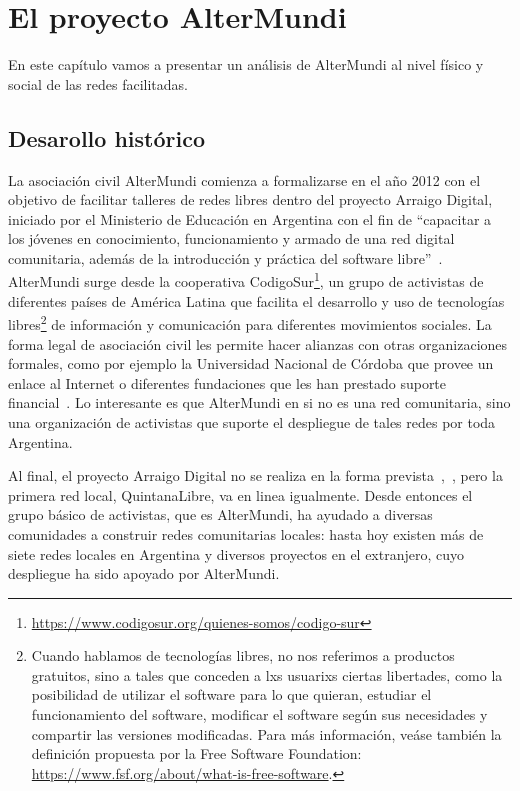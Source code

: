 \section{El proyecto AlterMundi}

En este capítulo vamos a presentar un análisis de AlterMundi al nivel físico y social de las redes facilitadas.

\subsection{Desarollo histórico}

La asociación civil AlterMundi comienza a formalizarse en el año 2012 con el objetivo de facilitar talleres de redes libres dentro del proyecto Arraigo Digital, iniciado por el Ministerio de Educación en Argentina con el fin de ``capacitar a los jóvenes en conocimiento, funcionamiento y armado de una red digital comunitaria, además de la introducción y práctica del software libre''~\autocite{Piccoli2015}.
AlterMundi surge desde la cooperativa CodigoSur\footnote{\url{https://www.codigosur.org/quienes-somos/codigo-sur}}, un grupo de activistas de diferentes países de América Latina que facilita el desarrollo y uso de tecnologías libres\footnote{Cuando
 hablamos de tecnologías libres, no nos referimos a productos gratuitos, sino a tales que conceden a lxs usuarixs ciertas libertades, como la posibilidad de utilizar el software para lo que quieran, estudiar el funcionamiento del software, modificar el software según sus necesidades y compartir las versiones modificadas.
Para más información, veáse también la definición propuesta por la Free Software Foundation: \url{https://www.fsf.org/about/what-is-free-software}.}
de información y comunicación para diferentes movimientos sociales.
La forma legal de asociación civil les permite hacer alianzas con otras organizaciones formales, como por ejemplo la Universidad Nacional de Córdoba que provee un enlace al Internet o diferentes fundaciones que les han prestado suporte financial~\autocite{Vaseva2016a}.
Lo interesante es que AlterMundi en si no es una red comunitaria, sino una organización de activistas que suporte el despliegue de tales redes por toda Argentina.

Al final, el proyecto Arraigo Digital no se realiza en la forma prevista~\autocite{Vaseva2016a},~\autocite{Piccoli2015}, pero la primera red local, QuintanaLibre, va en linea igualmente.
Desde entonces el grupo básico de activistas, que es AlterMundi, ha ayudado a diversas comunidades a construir redes comunitarias locales:
hasta hoy existen más de siete redes locales en Argentina y diversos proyectos en el extranjero, cuyo despliegue ha sido apoyado por AlterMundi.

